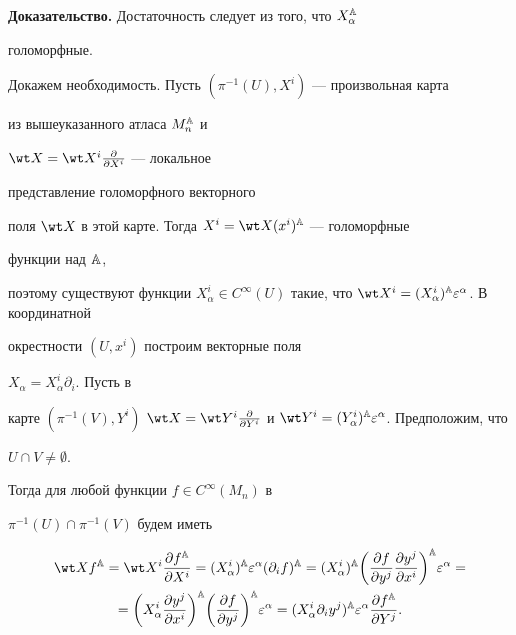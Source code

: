  


{\bf Доказательство.} Достаточность следует из того, что $X^{\Bbb A}_\alpha$ 


голоморфные. 


Докажем необходимость. Пусть $(\pi^{-1}(U),X^i)$ --- произвольная карта 


из вышеуказанного атласа $M^{\Bbb A}_n$ и 


$\wt X=\wt X^i\frac{\partial}{\partial X^i}$ --- локальное 


представление голоморфного векторного 


поля $\wt X$ в этой карте. Тогда $X^i=\wt X(x^i)\A$ --- голоморфные 


функции над $\Bbb A$,  


поэтому существуют функции $X^i_\alpha\in C^\infty(U)$ такие, что $\wt 


X^i=(X^i_\alpha)\A\varepsilon^\alpha$. В координатной 


окрестности $(U,x^i)$ построим векторные поля


$X_\alpha=X^i_\alpha\partial_i$. Пусть в  


карте $(\pi^{-1}(V),Y^i)$\; $\wt X=\wt Y^i\frac{\partial}{\partial 


Y^i}$ и $\wt Y^i=(Y^i_\alpha)\A\varepsilon^\alpha$. Предположим, что 


$U\cap V\ne \emptyset$. 


Тогда для любой функции $f\in C^\infty(M_n)$ в 


$\pi^{-1}(U)\cap\pi^{-1}(V)$ будем иметь 


\begin{multline*} 


\wt X f\A=\wt X^i\frac{\partial f\A}{\partial X^i}= 


(X^i_\alpha)\A\varepsilon^\alpha(\partial_i f)\A= 


(X^i_\alpha)\A\bigg(\frac{\partial f}{\partial y^j} 


\frac{\partial y^j}{\partial x^i}\bigg)\A\varepsilon^\alpha=\\ 


% 


=\bigg(X^i_\alpha\frac{\partial y^j}{\partial x^i}\bigg)\A 


\bigg(\frac{\partial f}{\partial y^j}\bigg)\A\varepsilon^\alpha= 


(X^i_\alpha\partial_i y^j)\A\varepsilon^\alpha 


\frac{\partial f\A}{\partial Y^j}. 


\end{multline*} 


